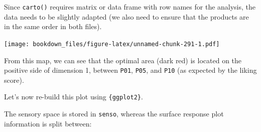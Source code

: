 \documentclass[
]{krantz}
\makeatletter
\newenvironment{Shaded}{\begin{snugshade}}{\end{snugshade}}
\newcommand{\AttributeTok}[1]{\textcolor[rgb]{0.61,0.61,0.61}{#1}}
\newcommand{\ConstantTok}[1]{\textcolor[rgb]{0,0,0}{#1}}
\newcommand{\DecValTok}[1]{\textcolor[rgb]{0.06,0.06,0.06}{#1}}
\newcommand{\FunctionTok}[1]{\textcolor[rgb]{0,0,0}{#1}}
\newcommand{\NormalTok}[1]{#1}
\newcommand{\OtherTok}[1]{\textcolor[rgb]{0.37,0.37,0.37}{#1}}
\newcommand{\SpecialCharTok}[1]{\textcolor[rgb]{0,0,0}{#1}}
\newcommand{\StringTok}[1]{\textcolor[rgb]{0.5,0.5,0.5}{#1}}
\newenvironment{kframe}{%
\medskip{}
\setlength{\fboxsep}{.8em}
 \def\at@end@of@kframe{}%
 \ifinner\ifhmode%
  \def\at@end@of@kframe{\end{minipage}}%
  \begin{minipage}{\columnwidth}%
 \fi\fi%
 \def\FrameCommand##1{\hskip\@totalleftmargin \hskip-\fboxsep
 \colorbox{shadecolor}{##1}\hskip-\fboxsep
     \hskip-\linewidth \hskip-\@totalleftmargin \hskip\columnwidth}%
 \MakeFramed {\advance\hsize-\width
   \@totalleftmargin\z@ \linewidth\hsize
   \@setminipage}}%
 {\par\unskip\endMakeFramed%
 \at@end@of@kframe}
\renewenvironment{Shaded}{\begin{kframe}}{\end{kframe}}
\makeatother
\begin{document}
Since \texttt{carto()} requires matrix or data frame with row names for the analysis, the data needs to be slightly adapted (we also need to ensure that the products are in the same order in both files).

\begin{Shaded}
\end{Shaded}

\texttt{[image: bookdown\_files/figure-latex/unnamed-chunk-291-1.pdf]}

From this map, we can see that the optimal area (dark red) is located on the positive side of dimension 1, between \texttt{P01}, \texttt{P05}, and \texttt{P10} (as expected by the liking score).

Let's now re-build this plot using \texttt{\{ggplot2\}}.

The sensory space is stored in \texttt{senso}, whereas the surface response plot information is split between:
\end{document}
